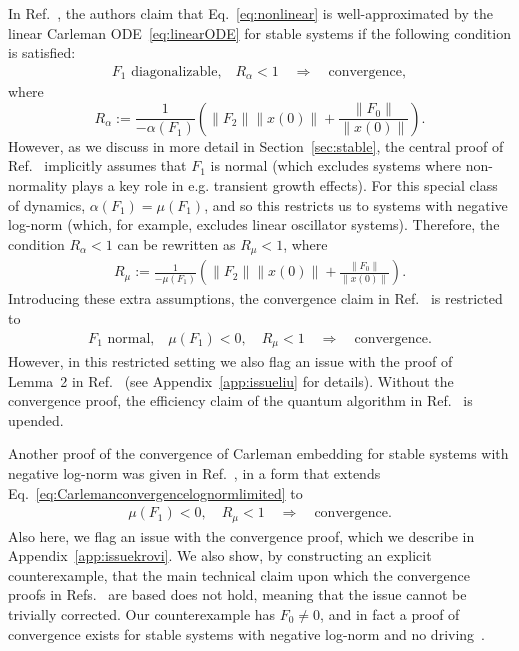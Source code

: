 \documentclass[superscriptaddress,onecolumn,nofootinbib,longbibliography,a4paper,accepted=2026-09-29]{quantumarticle}
\theoremstyle{plain}
\theoremstyle{definition}
\numberwithin{thm}{section}
\numberwithin{assumption}{section}
\numberwithin{lemma}{section}
\numberwithin{prop}{section}
\numberwithin{cor}{section}
\numberwithin{definition}{section}
\numberwithin{rmk}{section}
\numberwithin{equation}{section}
\begin{document}
    
In Ref.~\cite{liu2021efficient}, the authors claim that Eq.~\eqref{eq:nonlinear} is well-approximated by the linear Carleman ODE~\eqref{eq:linearODE} for stable systems if the following condition is satisfied:
    \begin{align}
        F_1 \textrm{ diagonalizable,}\quad  R_{\alpha} < 1 \quad\Rightarrow\quad \textrm{convergence},
\end{align}
where
\begin{equation}
    \label{eq:Ralpha}R_{\alpha}:= \frac{1}{-\alpha(F_1)} \left (  \|F_2\|\|x(0)\| + \frac{\|F_0\|}{ \|x(0)\|} \right ).
\end{equation}
However, as we discuss in more detail in Section~\ref{sec:stable}, the central proof of Ref.~\cite{liu2021efficient} implicitly assumes that $F_1$ is normal (which excludes systems where non-normality plays a key role in e.g. transient growth effects). 
For this special class of dynamics, $\alpha(F_1)=\mu(F_1)$, and so this restricts us to systems with negative log-norm (which, for example, excludes linear oscillator systems). Therefore, the condition $R_\alpha<1$ can be rewritten as $R_\mu<1$, where
\begin{align}
    \label{eq:Rmu}
        R_\mu:= \frac{1}{-\mu(F_1)} \left (  \|F_2\|\|x(0)\| + \frac{\|F_0\|}{ \|x(0)\|} \right ).
    \end{align} 
Introducing these extra assumptions, the convergence claim in Ref.~\cite{liu2021efficient} is restricted to
 \begin{align}
\label{eq:Carlemanconvergencelognormlimited}
     F_1 \textrm{ normal,}\quad \mu(F_1)<0, \quad R_\mu < 1 \quad\Rightarrow \quad\textrm{convergence}.
 \end{align}
However, in this restricted setting
we also flag an issue with the proof of Lemma~2 in Ref.~\cite{liu2021efficient} (see Appendix~\ref{app:issueliu} for details). Without the convergence proof, the efficiency claim of the quantum algorithm in Ref.~\cite{liu2021efficient} is upended.
    
Another proof of the convergence of Carleman embedding for stable systems with negative log-norm was given in Ref.~\cite{krovi2023improved}, in a form that extends Eq.~\eqref{eq:Carlemanconvergencelognormlimited} to
 \begin{align}
\label{eq:Carlemanconvergencelognorm}
     \mu(F_1) <0,\quad R_\mu < 1\quad \Rightarrow \quad\textrm{convergence}.
 \end{align}
Also here, we flag an issue with the convergence proof, which we describe in Appendix~\ref{app:issuekrovi}. We also show, by constructing an explicit counterexample, that the main technical claim upon which the convergence proofs in Refs.~\cite{liu2021efficient, krovi2023improved} are based does not hold, meaning that the issue cannot be trivially corrected. Our counterexample has $F_0 \neq 0$, and in fact a proof of convergence exists for stable systems with negative log-norm and no driving~\cite{costa2023further}. 
\end{document}
